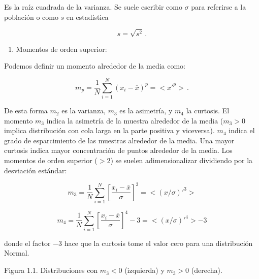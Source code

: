 \documentclass[
]{agujournal2019}
\providecommand{\tightlist}{%
  \setlength{\itemsep}{0pt}\setlength{\parskip}{0pt}}\usepackage{longtable,booktabs,array}
\begin{document}
Es la raíz cuadrada de la varianza. Se suele escribir como \(\sigma\)
para referirse a la población o como \(s\) en estadística

\begin{equation}
s=\sqrt{s^2}\,.
\end{equation}

\vspace{0.5cm}

\begin{enumerate}
\def\labelenumi{\arabic{enumi}.}
\setcounter{enumi}{3}
\tightlist
\item
  Momentos de orden superior:\\
\end{enumerate}

Podemos definir un momento alrededor de la media como:

\begin{equation}
m_p=\frac{1}{N}\sum^N_{i=1}(x_i-\bar{x})^p=<x'^p>\,.
\end{equation}

De esta forma \(m_2\) es la varianza, \(m_3\) es la asimetría, y \(m_4\)
la curtosis. El momento \(m_3\) indica la asimetría de la muestra
alrededor de la media (\(m_3>0\) implica distribución con cola larga en
la parte positiva y viceversa). \(m_4\) indica el grado de esparcimiento
de las muestras alrededor de la media. Una mayor curtosis indica mayor
concentración de puntos alrededor de la media. Los momentos de orden
superior (\(>2\)) se suelen adimensionalizar dividiendo por la
desviación estándar:

\begin{equation}
    m_3=\frac{1}{N}\sum^N_{i=1}\left[\frac{x_i-\bar{x}}{\sigma}\right]^3=<(x/\sigma)'^3>
\end{equation}

\begin{equation} 
    m_4=\frac{1}{N}\sum^N_{i=1}\left[\frac{x_i-\bar{x}}{\sigma}\right]^4-3=<(x/\sigma)'^4>-3
\end{equation}

donde el factor \(-3\) hace que la curtosis tome el valor cero para una
distribución Normal.

\vspace{0.5cm}

\begin{center}
\end{center}

\begin{center}
Figura 1.1. Distribuciones con $m_3<0$ (izquierda) y $m_3>0$ (derecha).
\end{center}
\end{document}
